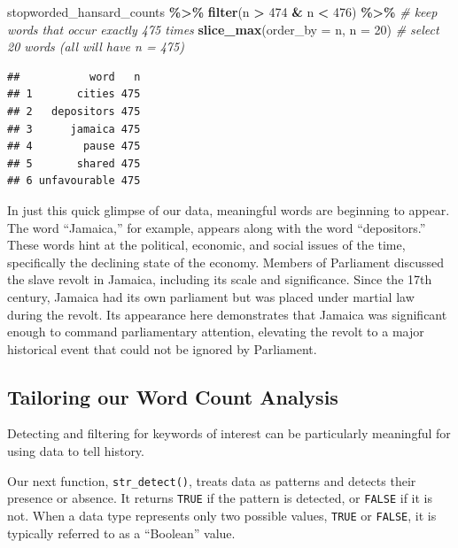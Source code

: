 \documentclass[
]{article}
\newenvironment{Shaded}{\begin{snugshade}}{\end{snugshade}}
\newcommand{\AttributeTok}[1]{\textcolor[rgb]{0.13,0.29,0.53}{#1}}
\newcommand{\CommentTok}[1]{\textcolor[rgb]{0.56,0.35,0.01}{\textit{#1}}}
\newcommand{\DecValTok}[1]{\textcolor[rgb]{0.00,0.00,0.81}{#1}}
\newcommand{\FunctionTok}[1]{\textcolor[rgb]{0.13,0.29,0.53}{\textbf{#1}}}
\newcommand{\NormalTok}[1]{#1}
\newcommand{\SpecialCharTok}[1]{\textcolor[rgb]{0.81,0.36,0.00}{\textbf{#1}}}
\begin{document}
\begin{Shaded}
\begin{Highlighting}[]
\NormalTok{stopworded\_hansard\_counts }\SpecialCharTok{\%\textgreater{}\%} 
  \FunctionTok{filter}\NormalTok{(n }\SpecialCharTok{\textgreater{}} \DecValTok{474} \SpecialCharTok{\&}\NormalTok{ n }\SpecialCharTok{\textless{}} \DecValTok{476}\NormalTok{) }\SpecialCharTok{\%\textgreater{}\%} \CommentTok{\# keep words that occur exactly 475 times}
  \FunctionTok{slice\_max}\NormalTok{(}\AttributeTok{order\_by =}\NormalTok{ n, }\AttributeTok{n =} \DecValTok{20}\NormalTok{) }\CommentTok{\# select 20 words (all will have n = 475)}
\end{Highlighting}
\end{Shaded}

\begin{verbatim}
##           word   n
## 1       cities 475
## 2   depositors 475
## 3      jamaica 475
## 4        pause 475
## 5       shared 475
## 6 unfavourable 475
\end{verbatim}

In just this quick glimpse of our data, meaningful words are beginning
to appear. The word ``Jamaica,'' for example, appears along with the
word ``depositors.'' These words hint at the political, economic, and
social issues of the time, specifically the declining state of the
economy. Members of Parliament discussed the slave revolt in Jamaica,
including its scale and significance. Since the 17th century, Jamaica
had its own parliament but was placed under martial law during the
revolt. Its appearance here demonstrates that Jamaica was significant
enough to command parliamentary attention, elevating the revolt to a
major historical event that could not be ignored by Parliament.

\subsection{Tailoring our Word Count
Analysis}\label{tailoring-our-word-count-analysis}

Detecting and filtering for keywords of interest can be particularly
meaningful for using data to tell history.

Our next function, \texttt{str\_detect()}, treats data as patterns and
detects their presence or absence. It returns \texttt{TRUE} if the
pattern is detected, or \texttt{FALSE} if it is not. When a data type
represents only two possible values, \texttt{TRUE} or \texttt{FALSE}, it
is typically referred to as a ``Boolean'' value.
\end{document}
